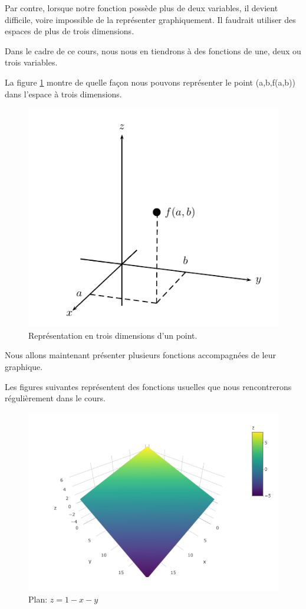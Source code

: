 \documentclass[]{book}
\theoremstyle{definition}
\theoremstyle{definition}
\theoremstyle{definition}
\theoremstyle{remark}
\let\BeginKnitrBlock\begin \let\EndKnitrBlock\end
\begin{document}
Par contre, lorsque notre fonction possède plus de deux variables, il
devient difficile, voire impossible de la représenter graphiquement. Il
faudrait utiliser des espaces de plus de trois dimensions.

\BeginKnitrBlock{remark}
{}Dans le cadre de ce cours, nous nous en
tiendrons à des fonctions de une, deux ou trois variables.
\EndKnitrBlock{remark}

La figure \ref{fig:point3d} montre de quelle façon nous pouvons
représenter le point (a,b,f(a,b)) dans l'espace à trois dimensions.

\begin{figure}

{\centering \includegraphics[width=0.75\linewidth]{resources/images/latex/point3d} 

}

\caption{Représentation en trois dimensions d'un point.}\label{fig:point3d}
\end{figure}

Nous allons maintenant présenter plusieurs fonctions accompagnées de
leur graphique.

Les figures suivantes représentent des fonctions usuelles que nous
rencontrerons régulièrement dans le cours.

\begin{figure}

{\centering \includegraphics[width=0.8\linewidth]{resources/images/plan} 

}

\caption{Plan: $z=1-x-y$}\label{fig:plan}
\end{figure}
\end{document}

